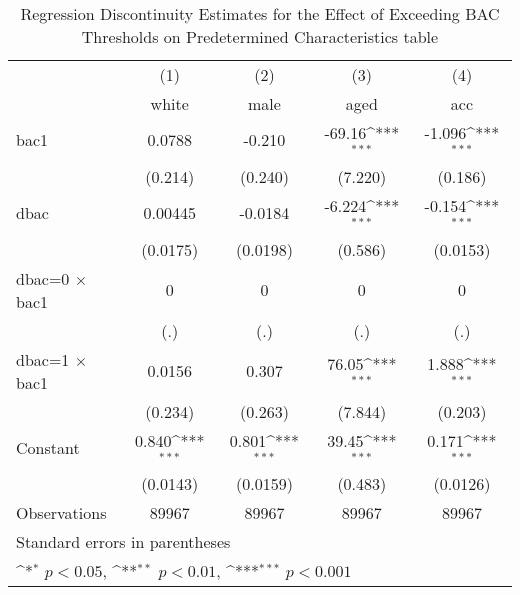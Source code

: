 \begin{table}[htbp]\centering
\def\sym#1{\ifmmode^{#1}\else\(^{#1}\)\fi}
\caption{Regression Discontinuity Estimates for the Effect of Exceeding BAC Thresholds on Predetermined Characteristics table\label{tab1}}
\begin{tabular}{l*{4}{c}}
\hline\hline
                    &\multicolumn{1}{c}{(1)}&\multicolumn{1}{c}{(2)}&\multicolumn{1}{c}{(3)}&\multicolumn{1}{c}{(4)}\\
                    &\multicolumn{1}{c}{white}&\multicolumn{1}{c}{male}&\multicolumn{1}{c}{aged}&\multicolumn{1}{c}{acc}\\
\hline
bac1                &      0.0788         &      -0.210         &      -69.16\sym{***}&      -1.096\sym{***}\\
                    &     (0.214)         &     (0.240)         &     (7.220)         &     (0.186)         \\
[1em]
dbac                &     0.00445         &     -0.0184         &      -6.224\sym{***}&      -0.154\sym{***}\\
                    &    (0.0175)         &    (0.0198)         &     (0.586)         &    (0.0153)         \\
[1em]
dbac=0 $\times$ bac1&           0         &           0         &           0         &           0         \\
                    &         (.)         &         (.)         &         (.)         &         (.)         \\
[1em]
dbac=1 $\times$ bac1&      0.0156         &       0.307         &       76.05\sym{***}&       1.888\sym{***}\\
                    &     (0.234)         &     (0.263)         &     (7.844)         &     (0.203)         \\
[1em]
Constant            &       0.840\sym{***}&       0.801\sym{***}&       39.45\sym{***}&       0.171\sym{***}\\
                    &    (0.0143)         &    (0.0159)         &     (0.483)         &    (0.0126)         \\
\hline
Observations        &       89967         &       89967         &       89967         &       89967         \\
\hline\hline
\multicolumn{5}{l}{\footnotesize Standard errors in parentheses}\\
\multicolumn{5}{l}{\footnotesize \sym{*} \(p<0.05\), \sym{**} \(p<0.01\), \sym{***} \(p<0.001\)}\\
\end{tabular}
\end{table}
